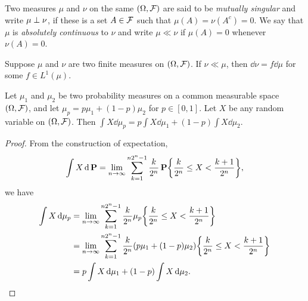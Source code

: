 \documentclass[12pt]{article}
\begin{document}
\begin{definition*}
    Two measures $\mu$ and $\nu$ on the same $(\Omega, \mathcal F)$ are said to be
    \emph{mutually singular} and write $\mu \perp \nu$, if these is a set
    $A \in \mathcal F$ such that $\mu(A) = \nu(A^c) = 0$.
    We say that $\mu$ is \emph{absolutely continuous} to $\nu$ and write
    $\mu \ll \nu$ if $\mu(A) = 0$ whenever $\nu(A) = 0$.
\end{definition*}

\begin{theorem*} \label{thm:radon}
    Suppose $\mu$ and $\nu$ are two finite measures on $(\Omega, \mathcal F)$.
    If $\nu \ll \mu$, then $\dd \nu = f \dd \mu$ for some $f \in L^1(\mu)$.
\end{theorem*}

\begin{lemma*}
    Let $\mu_1$ and $\mu_2$ be two probability measures on a common
    measurable space $(\Omega, \mathcal F)$, and let $\mu_p = p\mu_1 + (1-p)\mu_2$
    for $p \in [0, 1]$.
    Let $X$ be any random variable on $(\Omega, \mathcal F)$.
    Then $\int X \dd \mu_p = p \int X \dd \mu_1 + (1-p) \int X \dd \mu_2$.
\end{lemma*}
\begin{proof}
    From the construction of expectation, \[
        \int X \dd \P = \lim_{n \to \infty} \sum_{k=1}^{n2^n-1}
            \frac{k}{2^n} \P\set*{\frac{k}{2^n} \le X < \frac{k+1}{2^n}},
    \] we have \begin{align*}
        \int X \dd \mu_p &= \lim_{n \to \infty} \sum_{k=1}^{n2^n-1}
            \frac{k}{2^n} \mu_p\set*{\frac{k}{2^n} \le X < \frac{k+1}{2^n}} \\
        &= \lim_{n \to \infty} \sum_{k=1}^{n2^n-1}
            \frac{k}{2^n} (p\mu_1 + (1-p)\mu_2)\set*{\frac{k}{2^n} \le X < \frac{k+1}{2^n}} \\
        &= p \int X \dd \mu_1 + (1-p) \int X \dd \mu_2.
    \end{align*}
\end{proof}
\end{document}
